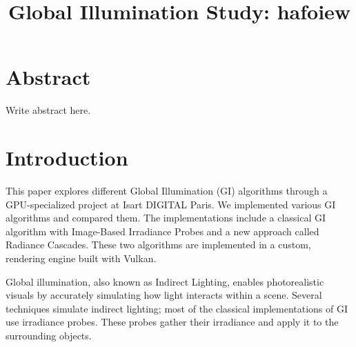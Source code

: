 \documentclass{rapportCS}
\title{Global Illumination Study: hafoiew}
\begin{document}







        
\fairemarges %

\fairepagedegarde %


\section*{Abstract}

Write abstract here.


\newpage



\contents %



\newpage

\section{Introduction} 

This paper explores different Global Illumination (GI) algorithms through a GPU-specialized project at Isart DIGITAL Paris. We implemented various GI algorithms and compared them. The implementations include a classical GI algorithm with Image-Based Irradiance Probes and a new approach called Radiance Cascades. These two algorithms are implemented in a custom, rendering engine built with Vulkan.

Global illumination, also known as Indirect Lighting, enables photorealistic visuals by accurately simulating how light interacts within a scene. Several techniques simulate indirect lighting; most of the classical implementations of GI use irradiance probes. These probes gather their irradiance and apply it to the surrounding objects.
    
\end{document}
